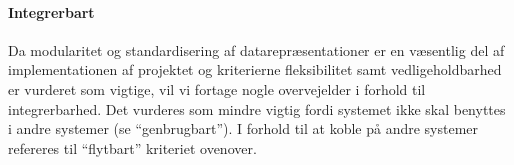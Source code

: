 \paragraph{Integrerbart} Da modularitet og standardisering af datarepræsentationer er en væsentlig del af implementationen af projektet og kriterierne fleksibilitet samt vedligeholdbarhed er vurderet som vigtige, vil vi fortage nogle overvejelder i forhold til integrerbarhed. Det vurderes som mindre vigtig fordi systemet ikke skal benyttes i andre systemer (se ``genbrugbart''). I forhold til at koble på andre systemer refereres til ``flytbart'' kriteriet ovenover.

